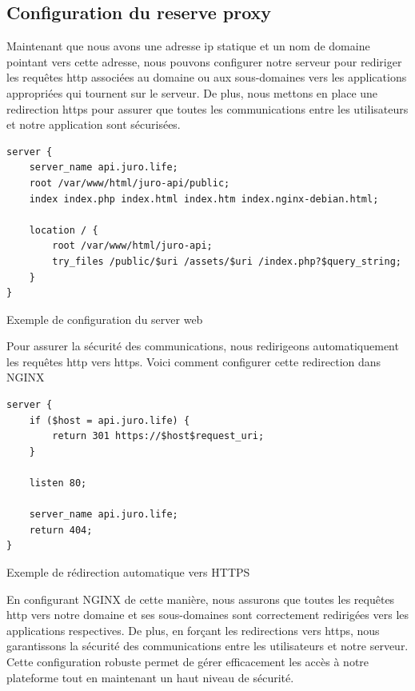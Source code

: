 \subsection{Configuration du reserve proxy}

Maintenant que nous avons une adresse \ac{ip} statique et un nom de domaine pointant vers cette adresse, nous pouvons configurer notre serveur pour rediriger les requêtes \ac{http} associées au domaine ou aux sous-domaines vers les applications appropriées qui tournent sur le serveur. De plus, nous mettons en place une redirection \ac{https} pour assurer que toutes les communications entre les utilisateurs et notre application sont sécurisées.

\begin{listing}[!ht]
\begin{verbatim}
server {
    server_name api.juro.life;
    root /var/www/html/juro-api/public;
    index index.php index.html index.htm index.nginx-debian.html;

    location / {
        root /var/www/html/juro-api;
        try_files /public/$uri /assets/$uri /index.php?$query_string;
    }
}
\end{verbatim}
\caption{Exemple de configuration du server web}
\label{appendix:code:conf:web-nginx}
\end{listing}

Pour assurer la sécurité des communications, nous redirigeons automatiquement les requêtes \ac{http} vers \ac{https}. Voici comment configurer cette redirection dans NGINX

\begin{listing}[!ht]
\begin{verbatim}
server {
    if ($host = api.juro.life) {
        return 301 https://$host$request_uri;
    }

    listen 80;

    server_name api.juro.life;
    return 404;
}
\end{verbatim}
\caption{Exemple de rédirection automatique vers HTTPS}
\label{appendix:code:conf:web-http}
\end{listing}

En configurant NGINX de cette manière, nous assurons que toutes les requêtes \ac{http} vers notre domaine et ses sous-domaines sont correctement redirigées vers les applications respectives. De plus, en forçant les redirections vers \ac{https}, nous garantissons la sécurité des communications entre les utilisateurs et notre serveur. Cette configuration robuste permet de gérer efficacement les accès à notre plateforme tout en maintenant un haut niveau de sécurité.

